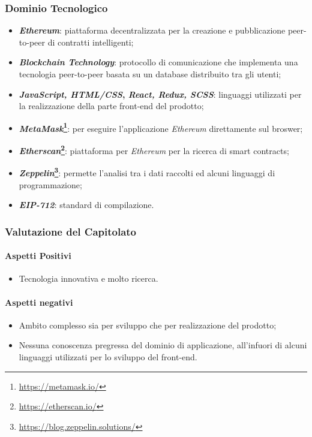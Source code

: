 \subsubsection{Dominio Tecnologico}

\begin{itemize}
  \item \textbf{\textit{Ethereum}\glossario}: piattaforma decentralizzata per la creazione e pubblicazione peer-to-peer di contratti intelligenti;
  \item \textbf{\textit{Blockchain Technology}\glossario}: protocollo di comunicazione che implementa una tecnologia peer-to-peer basata su un database distribuito tra gli utenti;
  \item \textbf{\textit{JavaScript, HTML/CSS},  \textit{React\glossario, Redux\glossario, SCSS\glossario}}: linguaggi utilizzati per la realizzazione della parte front-end del prodotto;
  \item \textbf{\textit{MetaMask}\footnote{\url{https://metamask.io/}}\glossario}: per eseguire l'applicazione \textit{Ethereum} direttamente sul broswer;
  \item \textbf{\textit{Etherscan}\footnote{\url{https://etherscan.io/}}\glossario}: piattaforma per \textit{Ethereum} per la ricerca di smart contracts;
  \item \textbf{\textit{Zeppelin}\footnote{\url{https://blog.zeppelin.solutions/}}\glossario}: permette l'analisi tra i dati raccolti ed alcuni linguaggi di programmazione;
  \item \textbf{\textit{EIP-712}}: standard di compilazione.
\end{itemize}

\subsubsection{Valutazione del Capitolato}
\paragraph{Aspetti Positivi}
\begin{itemize}
  \item Tecnologia innovativa e molto ricerca.
\end{itemize}

\paragraph{Aspetti negativi}
\begin{itemize}
  \item Ambito complesso sia per sviluppo che per realizzazione del prodotto;
  \item Nessuna conoscenza pregressa del dominio di applicazione, all'infuori di alcuni linguaggi utilizzati per lo sviluppo del front-end.
\end{itemize}

